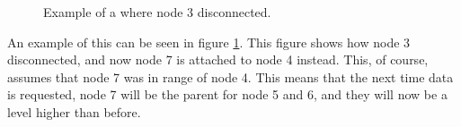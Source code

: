 \begin{figure}[!h]
	\centering
	\caption{Example of a where node 3 disconnected.}
	\label{fig:prottree2}
\end{figure}

An example of this can be seen in figure \ref{fig:prottree2}. This figure shows how node 3 disconnected, and now node 7 is attached to node 4 instead. This, of course, assumes that node 7 was in range of node 4.
This means that the next time data is requested, node 7 will be the parent for node 5 and 6, and they will now be a level higher than before.
